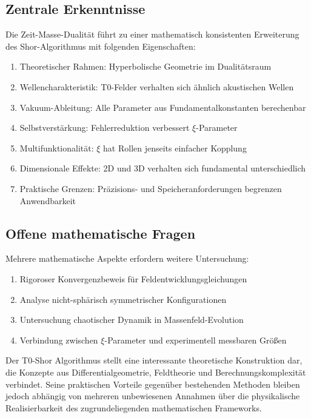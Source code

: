 \documentclass[12pt,a4paper]{article}
\newcommand{\xipar}{\xi}
\begin{document}
	\subsection{Zentrale Erkenntnisse}
	
	Die Zeit-Masse-Dualität führt zu einer mathematisch konsistenten Erweiterung des Shor-Algorithmus mit folgenden Eigenschaften:
	
	\begin{enumerate}
		\item Theoretischer Rahmen: Hyperbolische Geometrie im Dualitätsraum
		\item Wellencharakteristik: T0-Felder verhalten sich ähnlich akustischen Wellen
		\item Vakuum-Ableitung: Alle Parameter aus Fundamentalkonstanten berechenbar
		\item Selbstverstärkung: Fehlerreduktion verbessert $\xipar$-Parameter
		\item Multifunktionalität: $\xipar$ hat Rollen jenseits einfacher Kopplung
		\item Dimensionale Effekte: 2D und 3D verhalten sich fundamental unterschiedlich
		\item Praktische Grenzen: Präzisions- und Speicheranforderungen begrenzen Anwendbarkeit
	\end{enumerate}
	
	\subsection{Offene mathematische Fragen}
	
	Mehrere mathematische Aspekte erfordern weitere Untersuchung:
	
	\begin{enumerate}
		\item Rigoroser Konvergenzbeweis für Feldentwicklungsgleichungen
		\item Analyse nicht-sphärisch symmetrischer Konfigurationen
		\item Untersuchung chaotischer Dynamik in Massenfeld-Evolution
		\item Verbindung zwischen $\xipar$-Parameter und experimentell messbaren Größen
	\end{enumerate}
	
	Der T0-Shor Algorithmus stellt eine interessante theoretische Konstruktion dar, die Konzepte aus Differentialgeometrie, Feldtheorie und Berechnungskomplexität verbindet. Seine praktischen Vorteile gegenüber bestehenden Methoden bleiben jedoch abhängig von mehreren unbewiesenen Annahmen über die physikalische Realisierbarkeit des zugrundeliegenden mathematischen Frameworks.
	
\end{document}
